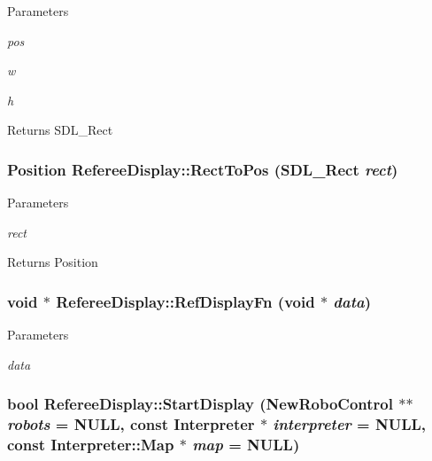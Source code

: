 \begin{DoxyParams}{Parameters}
\item[{\em pos}]\item[{\em w}]\item[{\em h}]\end{DoxyParams}
\begin{DoxyReturn}{Returns}
SDL\_\-Rect 
\end{DoxyReturn}
\hypertarget{classRefereeDisplay_a4abb9b85d92cbdd30fe6fd29a17c3767}{
\subsubsection[{RectToPos}]{\setlength{\rightskip}{0pt plus 5cm}Position RefereeDisplay::RectToPos (SDL\_\-Rect {\em rect})}}
\label{classRefereeDisplay_a4abb9b85d92cbdd30fe6fd29a17c3767}

\begin{DoxyParams}{Parameters}
\item[{\em rect}]\end{DoxyParams}
\begin{DoxyReturn}{Returns}
Position 
\end{DoxyReturn}
\hypertarget{classRefereeDisplay_a0aecfa7e27f573859a1bb037aca9693a}{
\subsubsection[{RefDisplayFn}]{\setlength{\rightskip}{0pt plus 5cm}void $\ast$ RefereeDisplay::RefDisplayFn (void $\ast$ {\em data})}}
\label{classRefereeDisplay_a0aecfa7e27f573859a1bb037aca9693a}

\begin{DoxyParams}{Parameters}
\item[{\em data}]\end{DoxyParams}
\hypertarget{classRefereeDisplay_a6b789ef1ca73c72556cf5051a8a2b5a6}{
\subsubsection[{StartDisplay}]{\setlength{\rightskip}{0pt plus 5cm}bool RefereeDisplay::StartDisplay ({\bf NewRoboControl} $\ast$$\ast$ {\em robots} = {\ttfamily NULL}, \/  const {\bf Interpreter} $\ast$ {\em interpreter} = {\ttfamily NULL}, \/  const {\bf Interpreter::Map} $\ast$ {\em map} = {\ttfamily NULL})}}
\label{classRefereeDisplay_a6b789ef1ca73c72556cf5051a8a2b5a6}

